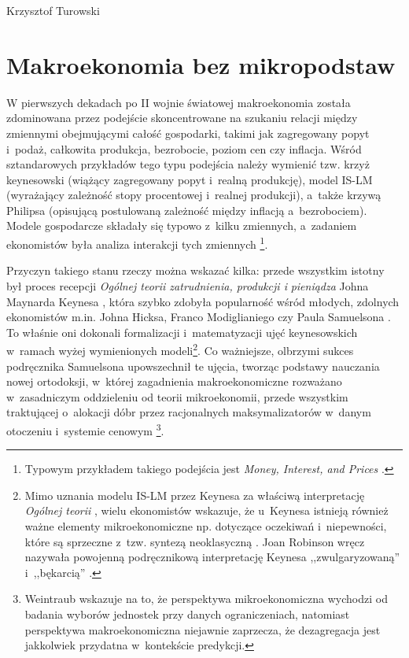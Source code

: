 \begin{artplenv}{Krzysztof Turowski}
\section{Makroekonomia bez mikropodstaw}
W pierwszych dekadach po II wojnie światowej makroekonomia została zdominowana przez podejście skoncentrowane na
szukaniu relacji między zmiennymi obejmującymi całość gospodarki, takimi jak zagregowany popyt i~podaż, całkowita
produkcja, bezrobocie, poziom cen czy inflacja. Wśród sztandarowych przykładów tego typu podejścia należy wymienić tzw.
krzyż keynesowski (wiążący zagregowany popyt i~realną produkcję), model IS-LM (wyrażający zależność stopy
procentowej i~realnej produkcji), a~także krzywą Philipsa (opisującą postulowaną zależność między inflacją a~bezrobociem).
Modele gospodarcze składały się typowo z~kilku zmiennych, a~zadaniem ekonomistów była analiza interakcji tych zmiennych
\parencite{lachmann_macro-economic_1973}\footnote{Typowym przykładem takiego podejścia jest \textit{Money, Interest,
and Prices}
\parencite{patinkin_money_1956}.
}.

Przyczyn takiego stanu rzeczy można wskazać kilka: przede wszystkim istotny był proces recepcji \textit{Ogólnej teorii
zatrudnienia, produkcji i} \textit{pieniądza} Johna Maynarda Keynesa
\parencite*{keynes_general_1936},
która szybko
zdobyła popularność wśród młodych, zdolnych ekonomistów m.in. Johna Hicksa, Franco Modiglianiego czy Paula Samuelsona
\parencite{moggridge_diffusion_1995}.
To właśnie oni dokonali formalizacji i~matematyzacji ujęć
keynesowskich w~ramach wyżej wymienionych modeli\footnote{Mimo uznania modelu IS-LM przez Keynesa za właściwą
interpretację \textit{Ogólnej teorii}
\parencite{king_history_2003},
wielu ekonomistów wskazuje, że u~Keynesa
istnieją również ważne elementy mikroekonomiczne np. dotyczące oczekiwań i~niepewności, które są sprzeczne z~tzw.
syntezą neoklasyczną
\parencite{leijonhufvud_keynes_1969}.
Joan Robinson wręcz nazywała powojenną
podręcznikową interpretację Keynesa ,,zwulgaryzowaną'' i~,,bękarcią''
\parencite{robinson_what_1974}.
}. Co
ważniejsze, olbrzymi sukces podręcznika Samuelsona upowszechnił te ujęcia, tworząc podstawy nauczania nowej ortodoksji,
w~której zagadnienia makroekonomiczne rozważano w~zasadniczym oddzieleniu od teorii mikroekonomii, przede wszystkim
traktującej o~alokacji dóbr przez racjonalnych maksymalizatorów w~danym otoczeniu i~systemie cenowym
\parencite{colander_coming_1996}\footnote{Weintraub
\parencite*{weintraub_microfoundations:_1979}
wskazuje na to,
że perspektywa mikroekonomiczna wychodzi od badania wyborów jednostek przy danych ograniczeniach, natomiast perspektywa
makroekonomiczna niejawnie zaprzecza, że dezagregacja jest jakkolwiek przydatna w~kontekście predykcji.}.


\end{artplenv}
